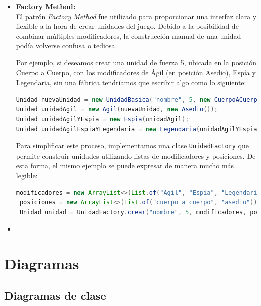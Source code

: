 \documentclass[titlepage,a4paper]{article}
\begin{document}
\begin{itemize}
		\item \textbf{Factory Method:} \\
		El patrón \textit{Factory Method} fue utilizado para proporcionar una interfaz clara y flexible a la hora de crear unidades del juego. Debido a la posibilidad de combinar múltiples modificadores, la construcción manual de una unidad podía volverse confusa o tediosa.

		Por ejemplo, si deseamos crear una unidad de fuerza 5, ubicada en la posición Cuerpo a Cuerpo, con los modificadores de Ágil (en posición Asedio), Espía y Legendaria, sin una fábrica tendríamos que escribir algo como lo siguiente:

		\begin{lstlisting}[language=Java, caption={Ejemplo de creación de unidad sin usar UnidadFactory}]
Unidad nuevaUnidad = new UnidadBasica("nombre", 5, new CuerpoACuerpo());
Unidad unidadAgil = new Agil(nuevaUnidad, new Asedio());
Unidad unidadAgilYEspia = new Espia(unidadAgil);
Unidad unidadAgilEspiaYLegendaria = new Legendaria(unidadAgilYEspia);
		\end{lstlisting}

		Para simplificar este proceso, implementamos una clase \texttt{UnidadFactory} que permite construir unidades utilizando listas de modificadores y posiciones. De esta forma, el mismo ejemplo se puede expresar de manera mucho más legible:

		\begin{lstlisting}[language=Java, caption={Ejemplo de creación de unidad usando UnidadFactory}]
 modificadores = new ArrayList<>(List.of("Agil", "Espia", "Legendaria"));
 posiciones = new ArrayList<>(List.of("cuerpo a cuerpo", "asedio"));
 Unidad unidad = UnidadFactory.crear("nombre", 5, modificadores, posiciones);
		\end{lstlisting}

	\item \end{itemize}






	


	\section{Diagramas}\label{sec:diagramas}


	\subsection{Diagramas de clase}\label{sec:diagramasdeclase}
\end{document}
